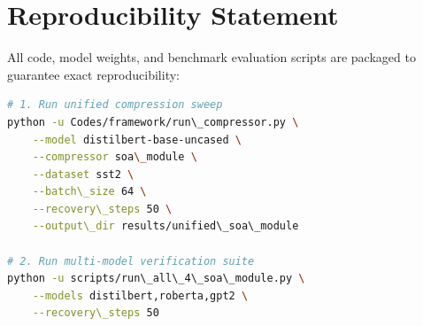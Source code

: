 \section{Reproducibility Statement}
All code, model weights, and benchmark evaluation scripts are packaged to guarantee exact reproducibility:
\begin{lstlisting}[language=bash]
# 1. Run unified compression sweep
python -u Codes/framework/run\_compressor.py \
    --model distilbert-base-uncased \
    --compressor soa\_module \
    --dataset sst2 \
    --batch\_size 64 \
    --recovery\_steps 50 \
    --output\_dir results/unified\_soa\_module

# 2. Run multi-model verification suite
python -u scripts/run\_all\_4\_soa\_module.py \
    --models distilbert,roberta,gpt2 \
    --recovery\_steps 50
\end{lstlisting}
